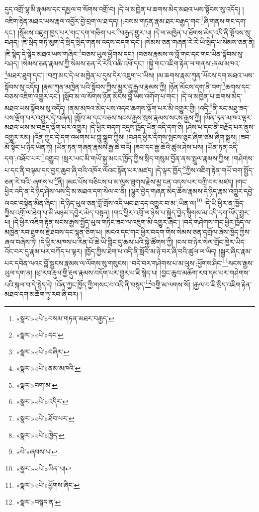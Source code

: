 དུད་འགྲོ་ལྷ་མི་རྣམས་དང་དམྱལ་བ་སོགས་འགྲོ་བ། །དེ་ལ་མཁྱེན་པ་ཆགས་མེད་མཐའ་ཡས་སྟོབས་སུ་འདོད། །འཇིག་རྟེན་མཐའ་ཡས་རྣལ་འབྱོར་བྱེ་བྲག་ལ་ཐ་དད། །:བསམ་གཏན་རྣམ་ཐར་བརྒྱད་གང་\footnote{«སྣར་»«པེ་»བསམ་གཏན་མཐར་བརྒྱད་}ཞི་གནས་གང་དག་དང་། །སྙོམས་འཇུག་ཁྱད་པར་གང་དག་གཅིག་པར་\footnote{«སྣར་»«པེ་»དང་}བརྒྱད་གྱུར་པ། །དེ་ལ་མཁྱེན་པ་ཐོགས་མེད་འདི་ནི་སྟོབས་སུ་བཤད། །ཇི་སྲིད་གཏི་མུག་དེ་སྲིད་སྲིད་གནས་འདས་བདག་དང་། །སེམས་ཅན་གཞན་རེ་རེ་ཡི་སྲིད་པ་སེམས་ཅན་ནི། །ཇི་སྙེད་དེ་སྙེད་མཐའ་ཡས་གཞིར་\footnote{«སྣར་»«པེ་»བཞིར་}བཅས་ཡུལ་ཕྱོགས་དང་། །བཅས་རྣམས་ལ་བློ་གང་དང་གང་ཡིན་སྟོབས་སུ་བཤད། །སེམས་ཅན་རྣམས་ཀྱི་སེམས་ཅན་རེ་རེའི་འཆི་འཕོ་དང་། །སྐྱེ་གང་འཇིག་རྟེན་ལ་གནས་:ནམ་མཁའ་\footnote{«སྣར་»«པེ་»ནམ་མཁའི་}མཐར་ཐུག་དང་། །བཀྲ་མང་དེ་ལ་མཁྱེན་པ་དུས་དེར་འཇུག་པ་ཡིས། །མ་ཆགས་རྣམ་ཀུན་ཡོངས་དག་མཐའ་ཡས་སྟོབས་སུ་འདོད། །རྣམ་ཀུན་མཁྱེན་པའི་སྟོབས་ཀྱིས་མྱུར་དུ་རྒྱལ་རྣམས་ཀྱི། །ཉོན་མོངས་དག་ནི་བག་\footnote{«སྣར་»བག་མ་}ཆགས་དང་བཅས་འཇིག་འགྱུར་དང་། །སློབ་མ་ལ་སོགས་ཉོན་མོངས་བློ་ཡིས་འགོག་པ་གང་། །དེ་ལ་མཁྱེན་པ་ཆགས་མེད་མཐའ་ཡས་སྟོབས་སུ་འདོད། །ནམ་མཁའ་མེད་པས་འདབ་ཆགས་ལྡོག་པར་མི་འགྱུར་གྱི། །འདི་\footnote{«སྣར་»«པེ་»འདིར་}ནི་རང་མཐུ་ཟད་པས་ལྡོག་པར་འགྱུར་དེ་བཞིན། །སློབ་མ་དང་བཅས་སངས་རྒྱས་སྲས་རྣམས་སངས་རྒྱས་ཀྱི། །ཡོན་ཏན་མཁའ་ལྟར་མཐའ་ཡས་མ་བརྗོད་ལྡོག་པར་འགྱུར། །དེ་ཕྱིར་བདག་འདྲས་ཁྱོད་ཡོན་འདི་དག་ཅི། །ཤེས་པ་དང་ནི་བརྗོད་པར་ནུས་འགྱུར་རམ། །འོན་ཀྱང་དེ་དག་འཕགས་པ་ཀླུ་སྒྲུབ་ཀྱིས། །བཤད་ཕྱིར་དོགས་སྤངས་ཅུང་ཞིག་ཙམ་ཞིག་སྨྲས། །ཟབ་མོ་སྟོང་པ་ཉིད་ཡིན་ཏེ། །ཡོན་ཏན་གཞན་རྣམས་རྒྱ་ཆེ་བའོ། །ཟབ་དང་རྒྱ་ཆེའི་ཚུལ་ཤེས་པས། །ཡོན་ཏན་འདི་དག་:འཐོབ་པར་\footnote{«སྣར་»«པེ་»ཐོབ་པར་}འགྱུར། །སླར་ཡང་མི་གཡོ་སྐུ་མངའ་ཁྱོད་ཀྱིས་སྲིད་གསུམ་བྱོན་ནས་སྤྲུལ་རྣམས་ཀྱིས། །གཤེགས་པ་དང་ནི་བལྟམ་དང་བྱང་ཆུབ་ཞི་བའི་འཁོར་ལོའང་སྟོན་པར་མཛད། །དེ་ལྟར་ཁྱོད་\footnote{«སྣར་»«པེ་»ཁྱེད་}ཀྱིས་འཇིག་རྟེན་གཡོ་བག་སྤྱོད་ཅན་རེ་བའི་:ཞགས་པ་\footnote{«པེ་»ཞབས་པ་}ནི། །མང་པོས་བཅིངས་པ་མ་ལུས་ཐུགས་རྗེས་མྱ་ངན་འདས་པར་བཀྲི་བར་མཛད། །གང་ཕྱིར་འདི་ན་དེ་ཉིད་ཤེས་ལས་དྲི་མ་མཐའ་དག་སེལ་བ་ནི། །ལྷུར་བྱེད་གཞན་མེད་ཆོས་རྣམས་དེ་ཉིད་རྣམ་འགྱུར་དབྱེ་ལའང་བསྟེན་མིན་ཞིང་། །དེ་ཉིད་ཡུལ་ཅན་བློ་གྲོས་འདི་ཡང་ཐ་དད་འགྱུར་བ་མ་:ཡིན་ལ།\footnote{«སྣར་»«པེ་»ཡིན་པ།} །དེ་ཡི་ཕྱིར་ན་ཁྱོད་ཀྱིས་འགྲོ་ལ་ཐེག་པ་མི་མཉམ་དབྱེར་མེད་བསྟན། །གང་ཕྱིར་འགྲོ་ལ་ཉེས་པ་སྐྱེད་བྱེད་སྙིགས་མ་འདི་དག་ཡོད་གྱུར་པ། །དེ་ཕྱིར་འཇིག་རྟེན་སངས་རྒྱས་སྤྱོད་ཡུལ་གཏིང་ཟབ་ལ་འཇུག་མི་འགྱུར་ཞིང་། །བདེ་གཤེགས་གང་ཕྱིར་ཁྱོད་ལ་མཁྱེན་རབ་ཐུགས་རྗེ་ཐབས་དང་ལྷན་ཅིག་པ། །མངའ་དང་གང་ཕྱིར་བདག་གིས་སེམས་ཅན་དགྲོལ་ཞེས་ཁྱོད་ཀྱིས་ཞལ་བཞེས་ཏེ། །དེ་ཕྱིར་མཁས་པ་རིན་པོ་ཆེ་ཡི་གླིང་དུ་ཆས་པའི་སྐྱེ་ཚོགས་ཀྱི། །ངལ་བ་ཉེར་སེལ་གྲོང་ཁྱེར་ཡིད་འོང་བར་དུ་རྣམ་པར་བཀོད་པ་ལྟར། །ཁྱོད་ཀྱིས་ཐེག་པ་འདི་ནི་སློབ་མ་ཉེ་བར་ཞི་བའི་ཚུལ་ལ་ཡིད། །སྦྱར་ཞིང་རྣམ་པར་དབེན་ལའང་བློ་སྦྱངས་རྣམས་ལ་ལོགས་སུ་གསུངས། །བདེ་བར་གཤེགས་པ་མ་ལུས་:ཕྱོགས་ཤིང་\footnote{«སྣར་»«པེ་»ཕྱོགས་ཞིང་}སངས་རྒྱས་ཡུལ་དག་ན། །ཕྲ་རབ་རྡུལ་གྱི་རྡུལ་རྣམས་བདོག་པར་གྱུར་པ་ཇི་སྙེད་པ། །བྱང་ཆུབ་མཆོག་རབ་དམ་པར་གཤེགས་པའི་སྐལ་བ་དེ་སྙེད་དེ། །འོན་ཀྱང་ཁྱོད་ཀྱི་གསང་བ་འདི་ནི་བསྙད་\footnote{«སྣར་»བསྙད་ན་}བགྱི་མ་ལགས་སོ། །རྒྱལ་བ་ཇི་སྲིད་འཇིག་རྟེན་མཐའ་དག་མཆོག་ཏུ་རབ་ཞི་བར། །
